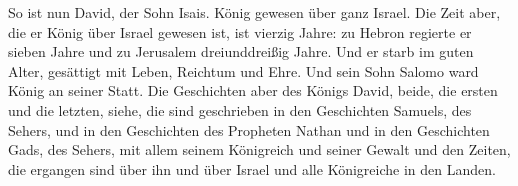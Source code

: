  So ist nun David, der Sohn Isais. König gewesen über ganz
Israel.  Die Zeit aber, die er König über Israel gewesen
ist, ist vierzig Jahre: zu Hebron regierte er sieben Jahre und zu
Jerusalem dreiunddreißig Jahre.  Und er starb im guten
Alter, gesättigt mit Leben, Reichtum und Ehre. Und sein Sohn Salomo ward
König an seiner Statt.  Die Geschichten aber des Königs
David, beide, die ersten und die letzten, siehe, die sind geschrieben in
den Geschichten Samuels, des Sehers, und in den Geschichten des
Propheten Nathan und in den Geschichten Gads, des Sehers, 
mit allem seinem Königreich und seiner Gewalt und den Zeiten, die
ergangen sind über ihn und über Israel und alle Königreiche in den
Landen.
